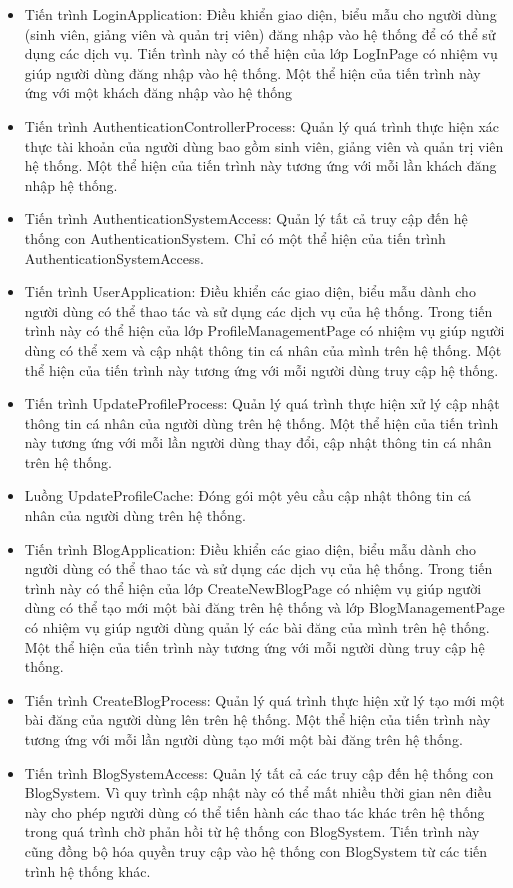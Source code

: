 \documentclass[./../main.tex]{subfiles}
\begin{document}
	\begin{itemize}
		\item Tiến trình LoginApplication: Điều khiển giao diện, biểu mẫu cho người dùng (sinh viên, giảng viên và quản trị viên) đăng nhập vào hệ thống để có thể sử dụng các dịch vụ. Tiến trình này có thể hiện của lớp LogInPage có nhiệm vụ giúp người dùng đăng nhập vào hệ thống.
		Một thể hiện của tiến trình này ứng với một khách đăng nhập vào hệ thống
		\item Tiến trình AuthenticationControllerProcess: Quản lý quá trình thực hiện xác thực tài khoản của người dùng bao gồm sinh viên, giảng viên và quản trị viên hệ thống.
		Một thể hiện của tiến trình này tương ứng với mỗi lần khách đăng nhập hệ thống.
		\item Tiến trình AuthenticationSystemAccess: Quản lý tất cả truy cập đến hệ thống con AuthenticationSystem.
		Chỉ có một thể hiện của tiến trình AuthenticationSystemAccess.
		\item Tiến trình UserApplication: Điều khiển các giao diện, biểu mẫu dành cho người dùng có thể thao tác và sử dụng các dịch vụ của hệ thống. Trong tiến trình này có  thể hiện của lớp ProfileManagementPage có nhiệm vụ giúp người dùng có thể xem và cập nhật thông tin cá nhân của mình trên hệ thống.
		Một thể hiện của tiến trình này tương ứng với mỗi người dùng truy cập hệ thống.
		\item Tiến trình UpdateProfileProcess: Quản lý quá trình thực hiện xử lý cập nhật thông tin cá nhân của người dùng trên hệ thống.
		Một thể hiện của tiến trình này tương ứng với mỗi lần người dùng thay đổi, cập nhật thông tin cá nhân trên hệ thống.
		\item Luồng UpdateProfileCache: Đóng gói một yêu cầu cập nhật thông tin cá nhân của người dùng trên hệ thống.
		\item Tiến trình BlogApplication: Điều khiển các giao diện, biểu mẫu dành cho người dùng có thể thao tác và sử dụng các dịch vụ của hệ thống. Trong tiến trình này có thể hiện của lớp CreateNewBlogPage có nhiệm vụ giúp người dùng có thể tạo mới một bài đăng trên hệ thống và lớp BlogManagementPage có nhiệm vụ giúp người dùng quản lý các bài đăng của mình trên hệ thống.
		Một thể hiện của tiến trình này tương ứng với mỗi người dùng truy cập hệ thống.
		\item Tiến trình CreateBlogProcess: Quản lý quá trình thực hiện xử lý tạo mới một bài đăng của người dùng lên trên hệ thống.
		Một thể hiện của tiến trình này tương ứng với mỗi lần người dùng tạo mới một bài đăng trên hệ thống.
		\item Tiến trình BlogSystemAccess: Quản lý tất cả các truy cập đến hệ thống con BlogSystem. Vì quy trình cập nhật này có thể mất nhiều thời gian nên điều này cho phép người dùng có thể tiến hành các thao tác khác trên hệ thống trong quá trình chờ phản hồi từ hệ thống con BlogSystem. Tiến trình này cũng đồng bộ hóa quyền truy cập vào hệ thống con BlogSystem từ các tiến trình hệ thống khác.

\end{itemize}
\end{document}
